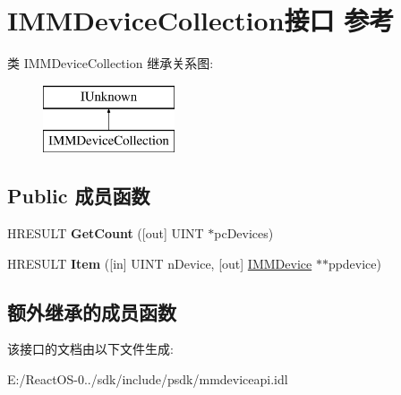 \hypertarget{interface_i_m_m_device_collection}{}\section{I\+M\+M\+Device\+Collection接口 参考}
\label{interface_i_m_m_device_collection}
类 I\+M\+M\+Device\+Collection 继承关系图\+:\begin{figure}[H]
\begin{center}
\leavevmode
\includegraphics[height=2.000000cm]{interface_i_m_m_device_collection}
\end{center}
\end{figure}
\subsection*{Public 成员函数}
\begin{DoxyCompactItemize}
\item 
\mbox{\label{interface_i_m_m_device_collection_a9055b2b0b93538ea5cc2695d64d9c584}} 
H\+R\+E\+S\+U\+LT {\bfseries Get\+Count} (\mbox{[}out\mbox{]} U\+I\+NT $\ast$pc\+Devices)
\item 
\mbox{\label{interface_i_m_m_device_collection_a4a6ab9a792d26d7d38d938884bb2c7fb}} 
H\+R\+E\+S\+U\+LT {\bfseries Item} (\mbox{[}in\mbox{]} U\+I\+NT n\+Device, \mbox{[}out\mbox{]} \hyperlink{interface_i_m_m_device}{I\+M\+M\+Device} $\ast$$\ast$ppdevice)
\end{DoxyCompactItemize}
\subsection*{额外继承的成员函数}


该接口的文档由以下文件生成\+:\begin{DoxyCompactItemize}
\item 
E\+:/\+React\+O\+S-\/0../sdk/include/psdk/mmdeviceapi.\+idl\end{DoxyCompactItemize}
